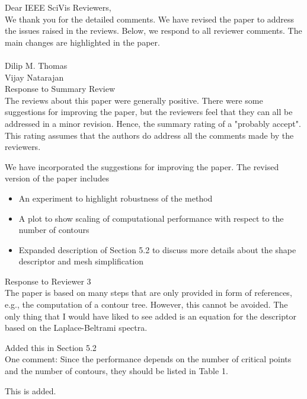 \documentclass[10pt]{article}
\title{}
\date{}
\begin{document}
\noindent Dear IEEE SciVis Reviewers,\\

We thank you for the detailed comments. We have revised the paper to address the issues raised in the reviews. Below, we respond to all reviewer comments. The main changes are highlighted in the paper.\\\\
Dilip M. Thomas\\
Vijay Natarajan\\

{\noindent \LARGE Response to Summary Review}\\

The reviews about this paper were generally positive. There were some
   suggestions for improving the paper, but the reviewers feel that they can
      all be addressed in a minor revision. Hence, the summary rating of a
         "probably accept". This rating assumes that the authors do address all
	    the comments made by the reviewers.

	    {\color{blue}We have incorporated the suggestions for improving the paper.
		    The revised version of the paper includes
		    \begin{itemize}
		    \item An experiment to highlight robustness of the method
		\item A plot to show scaling of computational performance with respect to the number of contours
		    \item Expanded description of Section 5.2 to discuss more details about the shape descriptor
			    and mesh simplification
    \end{itemize}}

{\noindent \LARGE Response to Reviewer 3}\\

The paper is based on many steps that are only provided in form of
   references, e.g., the computation of a contour tree. However, this cannot
   be avoided. The only thing that I would have liked to see added is an
   equation for the descriptor based on the Laplace-Beltrami spectra.

   {\color{blue}Added this in Section 5.2}\\

   One comment:
   Since the performance depends on the number of critical points and the
   number of contours, they should be listed in Table 1.

   {\color{blue}This is added.}\\
\end{document}

